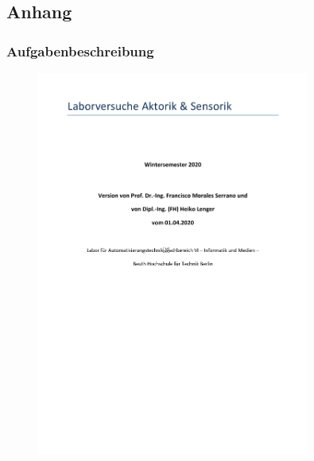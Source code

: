 \subsection{Anhang}

\subsubsection{Aufgabenbeschreibung}
\begin{figure}[H]
    \centering
    \includegraphics[page=3, width=0.8\textwidth]{../Aufgabenstellung.pdf}
    \label{fig:Aufgabenstellung A1}
\end{figure}

